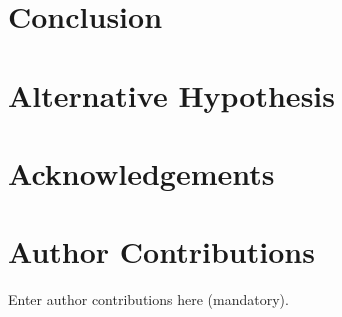 \documentclass[10pt,a4paper,twocolumn]{article}
\begin{document}
\section{Conclusion}


\section{Alternative Hypothesis}

\section*{Acknowledgements}

%



\appendix
\section{Author Contributions}
Enter author contributions here (mandatory).
\end{document}

